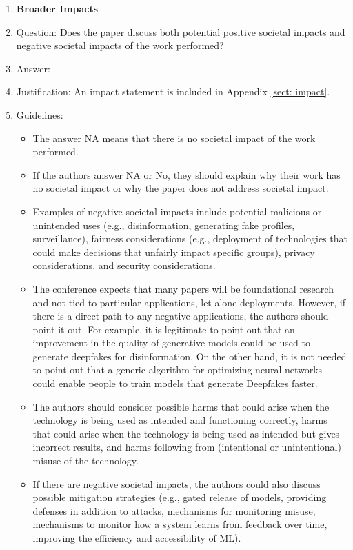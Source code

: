 \documentclass{article}
\theoremstyle{plain}
\theoremstyle{definition}
\theoremstyle{remark}
\begin{document}
\begin{enumerate}
\item {\bf Broader Impacts}
    \item[] Question: Does the paper discuss both potential positive societal impacts and negative societal impacts of the work performed?
    \item[] Answer: \answerYes{} %
    \item[] Justification: An impact statement is included in Appendix \ref{sect: impact}.
    \item[] Guidelines:
    \begin{itemize}
        \item The answer NA means that there is no societal impact of the work performed.
        \item If the authors answer NA or No, they should explain why their work has no societal impact or why the paper does not address societal impact.
        \item Examples of negative societal impacts include potential malicious or unintended uses (e.g., disinformation, generating fake profiles, surveillance), fairness considerations (e.g., deployment of technologies that could make decisions that unfairly impact specific groups), privacy considerations, and security considerations.
        \item The conference expects that many papers will be foundational research and not tied to particular applications, let alone deployments. However, if there is a direct path to any negative applications, the authors should point it out. For example, it is legitimate to point out that an improvement in the quality of generative models could be used to generate deepfakes for disinformation. On the other hand, it is not needed to point out that a generic algorithm for optimizing neural networks could enable people to train models that generate Deepfakes faster.
        \item The authors should consider possible harms that could arise when the technology is being used as intended and functioning correctly, harms that could arise when the technology is being used as intended but gives incorrect results, and harms following from (intentional or unintentional) misuse of the technology.
        \item If there are negative societal impacts, the authors could also discuss possible mitigation strategies (e.g., gated release of models, providing defenses in addition to attacks, mechanisms for monitoring misuse, mechanisms to monitor how a system learns from feedback over time, improving the efficiency and accessibility of ML).
    \end{itemize}
    

\end{enumerate}
\end{document}
